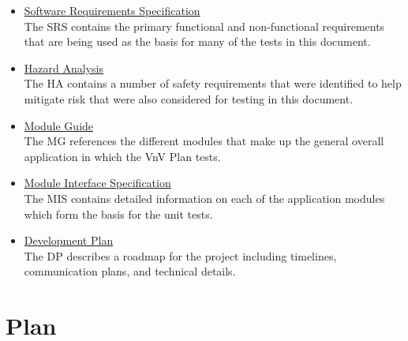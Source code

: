 \documentclass[12pt, titlepage]{article}
\begin{document}
\begin{itemize}
  \item \href{https://github.com/r-yeh/grocery-spending-tracker/blob/master/docs/SRS/SRS.pdf}{Software Requirements Specification} \citet{GrocerySRS}\\
  The SRS contains the primary functional and non-functional requirements that are being used as the basis for many of the tests in this document.
  \item \href{https://github.com/r-yeh/grocery-spending-tracker/blob/master/docs/HazardAnalysis/HazardAnalysis.pdf}{Hazard Analysis} \citet{GroceryHA}\\
  The HA contains a number of safety requirements that were identified to help mitigate risk that were also considered for testing in this document.
  \item \href{https://github.com/r-yeh/grocery-spending-tracker/blob/master/docs/Design/SoftArchitecture/MG.pdf}{Module Guide}\\
  The MG references the different modules that make up the general overall application in which the VnV Plan tests.
  \item \href{https://github.com/r-yeh/grocery-spending-tracker/blob/master/docs/Design/SoftDetailedDes/MIS.pdf}{Module Interface Specification}\\
  The MIS contains detailed information on each of the application modules which form the basis for the unit tests.
  \item \href{https://github.com/r-yeh/grocery-spending-tracker/blob/master/docs/DevelopmentPlan/DevelopmentPlan.pdf}{Development Plan} \citet{GroceryDP}\\
  The DP describes a roadmap for the project including timelines, communication plans, and technical details.
\end{itemize}

\section{Plan}
\end{document}

